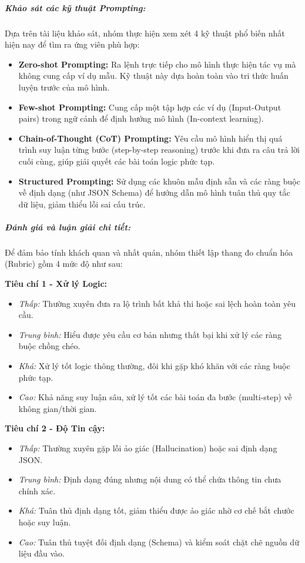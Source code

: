 \subparagraph{Khảo sát các kỹ thuật Prompting:}

Dựa trên tài liệu khảo sát, nhóm thực hiện xem xét 4 kỹ thuật phổ biến nhất hiện nay để tìm ra ứng viên phù hợp:

\begin{itemize}
    \item \textbf{Zero-shot Prompting:} Ra lệnh trực tiếp cho mô hình thực hiện tác vụ mà không cung cấp ví dụ mẫu. Kỹ thuật này dựa hoàn toàn vào tri thức huấn luyện trước của mô hình.
    
    \item \textbf{Few-shot Prompting:} Cung cấp một tập hợp các ví dụ (Input-Output pairs) trong ngữ cảnh để định hướng mô hình (In-context learning).
    
    \item \textbf{Chain-of-Thought (CoT) Prompting:} Yêu cầu mô hình hiển thị quá trình suy luận từng bước (step-by-step reasoning) trước khi đưa ra câu trả lời cuối cùng, giúp giải quyết các bài toán logic phức tạp.
    
    \item \textbf{Structured Prompting:} Sử dụng các khuôn mẫu định sẵn và các ràng buộc về định dạng (như JSON Schema) để hướng dẫn mô hình tuân thủ quy tắc dữ liệu, giảm thiểu lỗi sai cấu trúc.
\end{itemize}

\subparagraph{Đánh giá và luận giải chi tiết:}

Để đảm bảo tính khách quan và nhất quán, nhóm thiết lập thang đo chuẩn hóa (Rubric) gồm 4 mức độ như sau:

\textbf{Tiêu chí 1 - Xử lý Logic:}
\begin{itemize}
    \item \textit{Thấp:} Thường xuyên đưa ra lộ trình bất khả thi hoặc sai lệch hoàn toàn yêu cầu.
    \item \textit{Trung bình:} Hiểu được yêu cầu cơ bản nhưng thất bại khi xử lý các ràng buộc chồng chéo.
    \item \textit{Khá:} Xử lý tốt logic thông thường, đôi khi gặp khó khăn với các ràng buộc phức tạp.
    \item \textit{Cao:} Khả năng suy luận sâu, xử lý tốt các bài toán đa bước (multi-step) về không gian/thời gian.
\end{itemize}

\textbf{Tiêu chí 2 - Độ Tin cậy:}
\begin{itemize}
    \item \textit{Thấp:} Thường xuyên gặp lỗi ảo giác (Hallucination) hoặc sai định dạng JSON.
    \item \textit{Trung bình:} Định dạng đúng nhưng nội dung có thể chứa thông tin chưa chính xác.
    \item \textit{Khá:} Tuân thủ định dạng tốt, giảm thiểu được ảo giác nhờ cơ chế bắt chước hoặc suy luận.
    \item \textit{Cao:} Tuân thủ tuyệt đối định dạng (Schema) và kiểm soát chặt chẽ nguồn dữ liệu đầu vào.
\end{itemize}

